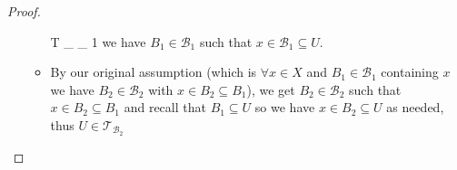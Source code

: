 \begin{proof}
\begin{itemize}
\begin{itemize}
{        T} _{  _{ 1 }   }   \) we have \( B _{ 1  } \in \mathcal{ B
        } _{ 1 }   \) such that \( x \in \mathcal{ B } _{ 1 } \subseteq U  \). 
        \item By our original assumption (which is \( \forall x \in  X \) and \(
        B _{ 1 }  \in \mathcal{ B } _{ 1 }  \) containing \( x \) we have  \( B
        _{ 2 } \in  \mathcal{ B } _{ 2 }  \) with \( x \in B _{ 2 } \subseteq B
        _{ 1 } \)), we get \( B _{ 2 } \in  \mathcal{ B } _{ 2 }  \) such that
        \( x \in  B _{ 2 } \subseteq B _{ 1 } \) and recall that \( B _{ 1 }
        \subseteq U \) so we have \( x \in B _{ 2 } \subseteq U \) as needed,
        thus \( U \in  \mathcal{ T } _{ \mathcal{ B } _{ 2 }   }   \) 
    \end{itemize}
\end{itemize} 
\end{proof}
